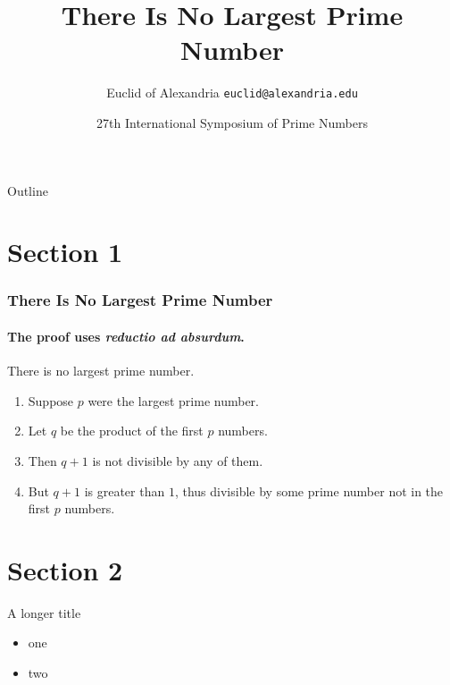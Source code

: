 \documentclass[aspectratio=1610]{beamer}
\title{There Is No Largest Prime Number}
\date[ISPN ’80]{27th International Symposium of Prime Numbers}
\author[Euclid]{Euclid of Alexandria \texttt{euclid@alexandria.edu}}
\begin{document}
\begin{frame}
\titlepage
\end{frame}

\begin{frame}{Outline}
    \tableofcontents
\end{frame}

\section{Section 1}
\begin{frame} 
    \frametitle{There Is No Largest Prime Number} 
    \framesubtitle{The proof uses \textit{reductio ad absurdum}.} 
    \begin{theorem}
    There is no largest prime number. \end{theorem} 
    \begin{enumerate} 
        \item<1-| alert@1> Suppose $p$ were the largest prime number. 
        \item<2-> Let $q$ be the product of the first $p$ numbers. 
        \item<3-> Then $q+1$ is not divisible by any of them. 
        \item<1-> But $q + 1$ is greater than $1$, thus divisible by some prime
            number not in the first $p$ numbers.
    \end{enumerate}
\end{frame}

\section{Section 2}
\begin{frame}{A longer title}
    \begin{itemize}
        \item one
        \item two
    \end{itemize}
\end{frame}
\end{document}
